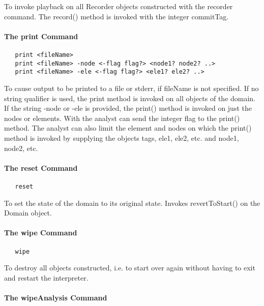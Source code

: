 \documentclass[12pt]{article}
\begin{document}
\noindent To invoke playback on all Recorder objects constructed with
the recorder command. The record() method is invoked with the integer
commitTag. 

\paragraph {The print Command}

{\sf\small
\begin{verbatim}
   print <fileName> 
   print <fileName> -node <-flag flag?> <node1? node2? ..>
   print <fileName> -ele <-flag flag?> <ele1? ele2? ..>
\end{verbatim}
}

\noindent To cause output to be printed to a file or stderr, if fileName is not
specified. If no string qualifier is used, the print method is
invoked on all objects of the domain. If the string -node or -ele is provided,
the print() method is invoked on just the nodes or elements. With
the analyst can send the integer flag to the print() method. The
analyst can also limit the element and nodes on which the
print() method is invoked by supplying the objects tags, ele1, ele2,
etc. and node1, node2, etc.

\paragraph {The reset Command}

{\sf\small
\begin{verbatim}
   reset
\end{verbatim}
 }

\noindent To set the state of the domain to its original state. Invokes
revertToStart() on the Domain object.

\paragraph {The wipe Command}

{\sf\small
\begin{verbatim}
   wipe
\end{verbatim}
}

\noindent To destroy all objects constructed, i.e. to start over again
without having to exit and restart the interpreter.

\paragraph {The wipeAnalysis Command}
\end{document}
